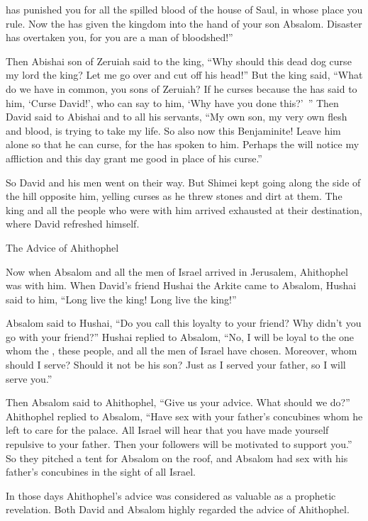 {{}
has punished
you for all
the spilled blood
of the house
of Saul,
in whose
place
you
rule.
Now
the {}
has given
the kingdom
into the hand
of your son
Absalom.
Disaster
has overtaken
you,
for
you are
a man
of bloodshed!”
\par }{\PP {}Then Abishai
son
of Zeruiah
said
to
the king,
“Why
should this
dead
dog
curse
my lord
the king? Let
me go over
and cut off
his head!”
But the king
said,
“What
do we have in common, you sons
of Zeruiah? If
he curses
because
the {}
has said
to him, ‘Curse
David!’, who can
say
to him, ‘Why
have you done
this?’ ”
Then David
said
to
Abishai
and to
all
his servants,
“My own son,
my very own flesh and blood,
is trying
to take my life.
So also
now
this
Benjaminite! Leave
him alone so that he can curse,
for
the {}
has spoken to him.
Perhaps
the {}
will notice
my affliction
and this
day
grant me good
in place
of his curse.”
\par }{\PP {}So
David
and his men
went on
their way.
But Shimei
kept going
along
the side
of the hill
opposite him, yelling
curses
as
he threw stones
and dirt at them.
The king
and all
the people
who
were with
him arrived exhausted
at their destination, where
David refreshed himself.
\par }{\SH The Advice of Ahithophel
\par }{\PP {}Now when Absalom
and all
the men
of Israel
arrived
in Jerusalem,
Ahithophel
was with him.
When
David’s
friend
Hushai
the Arkite
came
to
Absalom,
Hushai
said
to
him, “Long live
the king! Long live
the king!”
\par }{\PP {}Absalom
said
to
Hushai,
“Do you call this
loyalty
to your friend? Why
didn’t
you go
with
your friend?”
Hushai
replied
to
Absalom,
“No,
I will be
loyal to the one whom
the {}, these
people,
and all
the men
of Israel
have chosen.
Moreover,
whom
should I
serve? Should it not
be his son? Just
as I served
your father,
so
I will serve you.”
\par }{\PP {}Then Absalom
said
to Ahithophel,
“Give
us your advice.
What
should we do?”
Ahithophel
replied
to
Absalom,
“Have sex
with
your father’s
concubines
whom
he left
to care
for the palace.
All
Israel
will hear
that
you have made yourself repulsive
to your father.
Then your followers will be motivated
to support you.”
So they pitched
a tent
for Absalom
on
the roof,
and Absalom
had sex with his father’s
concubines
in the sight
of all
Israel.
\par }{\PP {}In those
days
Ahithophel’s
advice
was considered as
valuable
as
a prophetic
revelation. Both
David
and Absalom
highly
regarded
the advice
of Ahithophel.

}
